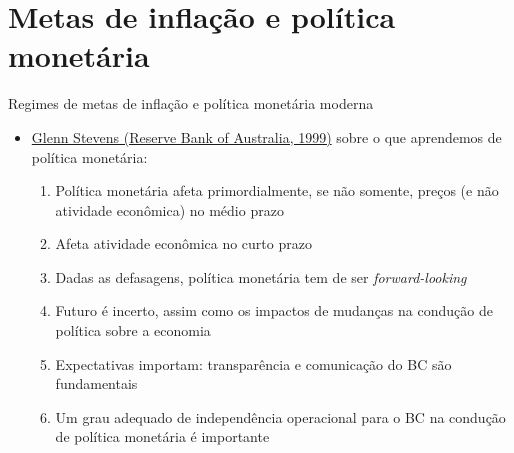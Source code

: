 \documentclass[10pt]{beamer}
\begin{document}
\section{Metas de inflação e política monetária}
\begin{frame}
    {Regimes de metas de inflação e política monetária moderna}
    \begin{itemize}
        \item \href{https://www.rba.gov.au/publications/bulletin/1999/may/pdf/bu-0599-2.pdf}{Glenn Stevens (Reserve Bank of Australia, 1999)} sobre o que aprendemos de política monetária:\medskip
        \begin{enumerate}
            \item Política monetária afeta primordialmente, se não somente, preços (e não atividade econômica) no médio prazo\medskip
            \item Afeta atividade econômica no curto prazo\medskip
            \item Dadas as defasagens, política monetária tem de ser \emph{forward-looking}\medskip
            \item Futuro é incerto, assim como os impactos de mudanças na condução de política sobre a economia\medskip
            \item Expectativas importam: transparência e comunicação do BC são fundamentais\medskip
            \item Um grau adequado de independência operacional para o BC na condução de política monetária é importante
        \end{enumerate}
    \end{itemize}
\end{frame}
\end{document}
